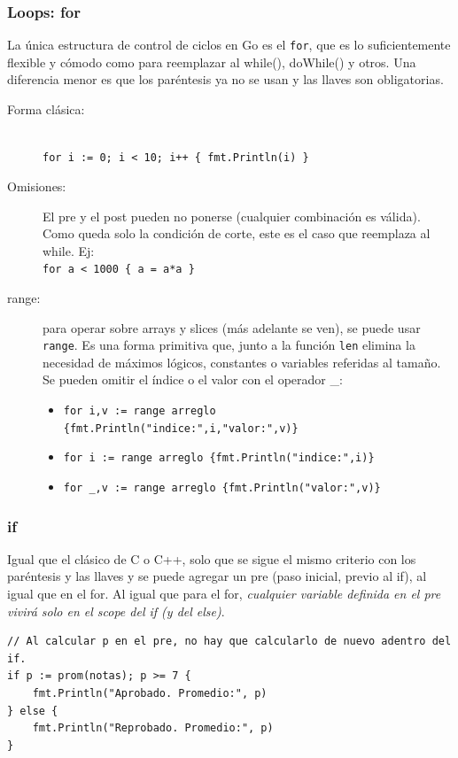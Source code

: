 \documentclass{article}
\begin{document}
\subsubsection{Loops: for}
La única estructura de control de ciclos en Go es el \lstinline|for|, que es lo suficientemente flexible y cómodo como para reemplazar al while(), do{}While() y otros. Una diferencia menor es que los paréntesis ya no se usan y las llaves son obligatorias.
\begin{description}
	\item[Forma clásica:] \hfill \\
		\lstinline|for i := 0; i < 10; i++ { fmt.Println(i) }|
	\item[Omisiones:] El pre y el post pueden no ponerse (cualquier combinación es válida). Como queda solo la condición de corte, este es el caso que reemplaza al while. Ej: \\
		\lstinline|for a < 1000 { a = a*a }|
	\item[range:] para operar sobre arrays y slices (más adelante se ven), se puede usar \lstinline|range|. Es una forma primitiva que, junto a la función \lstinline|len| elimina la necesidad de máximos lógicos, constantes o variables referidas al tamaño. Se pueden omitir el índice o el valor con el operador \_:
	\begin{itemize}
	\item \lstinline|for i,v := range arreglo {fmt.Println("indice:",i,"valor:",v)}|
	\item \lstinline|for i := range arreglo {fmt.Println("indice:",i)}|
	\item \lstinline|for _,v := range arreglo {fmt.Println("valor:",v)}|
	\end{itemize}
\end{description}
\subsubsection{if}
Igual que el clásico de C o C++, solo que se sigue el mismo criterio con los paréntesis y las llaves y se puede agregar un pre (paso inicial, previo al if), al igual que en el for. Al igual que para el for, \emph{cualquier variable definida en el pre vivirá solo en el scope del if (y del else)}. %
\begin{lstlisting}[caption = promedio precalculado.]
// Al calcular p en el pre, no hay que calcularlo de nuevo adentro del if.
if p := prom(notas); p >= 7 {
	fmt.Println("Aprobado. Promedio:", p)
} else {
	fmt.Println("Reprobado. Promedio:", p)
}
\end{lstlisting}
\end{document}
